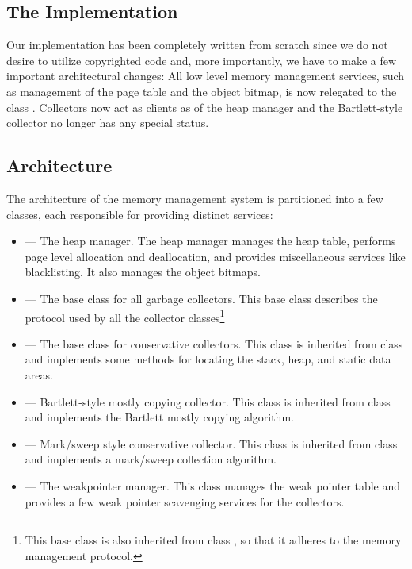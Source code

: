\subsection{The Implementation}

   Our implementation has been completely written from scratch since
we do not desire to utilize copyrighted code and, more importantly,
we have to make a few important architectural changes:
 All low level memory management services, such as management of
the page table and the object bitmap, is now relegated to the class 
.  Collectors now act as clients as of the heap manager
and the Bartlett-style collector no longer has any special status. 

\subsection{Architecture}

   The architecture of the memory management system is partitioned into
a few classes, each responsible for providing distinct services:

\begin{itemize}
   \item {} --- The heap manager.  The heap manager
    manages the heap table, performs page level
    allocation and deallocation, and provides miscellaneous services
    like blacklisting.  It also manages the object bitmaps.
   \item {} --- The base class for all garbage collectors.
    This base class describes the protocol used by all the collector
    classes\footnote{This base class is also inherited from class
    , so that it adheres to the \Prop{} memory management
    protocol.}
   \item {} --- The base class for conservative collectors.
     This class is inherited from class  and implements some
     methods for locating the stack, heap, and static data areas.
   \item {} --- Bartlett-style mostly copying collector.
      This class is inherited from class  and implements
      the Bartlett mostly copying algorithm.
   \item {} --- Mark/sweep style conservative collector.
      This class is inherited from class  and implements
      a mark/sweep collection algorithm.
   \item {} --- The weakpointer manager.
      This class manages the weak pointer table and provides a few
      weak pointer scavenging services for the collectors.
\end{itemize}
  
